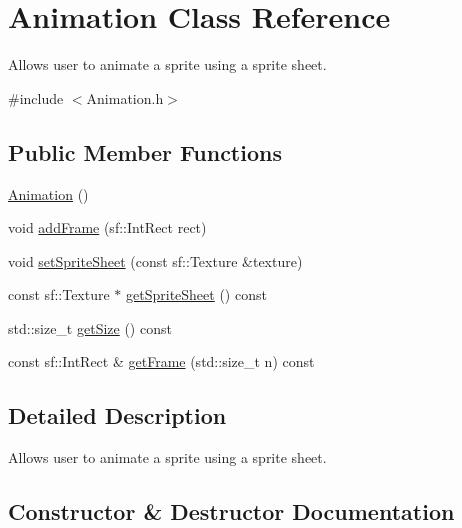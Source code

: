 \hypertarget{class_animation}{}\section{Animation Class Reference}
\label{class_animation}


Allows user to animate a sprite using a sprite sheet.  




{\ttfamily \#include $<$Animation.\+h$>$}

\subsection*{Public Member Functions}
\begin{DoxyCompactItemize}
\item 
\hyperlink{class_animation_a83f0a16cef7117f187ad596de38dd9d6}{Animation} ()
\item 
void \hyperlink{class_animation_a486ee5fa2d40ae90f227a19866998c91}{add\+Frame} (sf\+::\+Int\+Rect rect)
\item 
void \hyperlink{class_animation_a2fb16f452a323d51a0104c0aa454cab3}{set\+Sprite\+Sheet} (const sf\+::\+Texture \&texture)
\item 
const sf\+::\+Texture $\ast$ \hyperlink{class_animation_abf4f00f8b1657829583d7d92e71b93d1}{get\+Sprite\+Sheet} () const
\item 
std\+::size\+\_\+t \hyperlink{class_animation_ac6854dc96e9fc8ffd97feba43547c869}{get\+Size} () const
\item 
const sf\+::\+Int\+Rect \& \hyperlink{class_animation_a8cf30a3b19ba104eeb34b08f45cfabe2}{get\+Frame} (std\+::size\+\_\+t n) const
\end{DoxyCompactItemize}


\subsection{Detailed Description}
Allows user to animate a sprite using a sprite sheet. 



\subsection{Constructor \& Destructor Documentation}
\mbox{\label{class_animation_a83f0a16cef7117f187ad596de38dd9d6}} 
